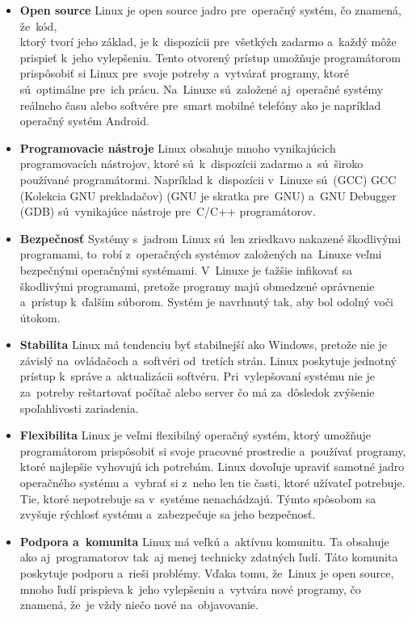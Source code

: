 \begin{itemize}
	\item \textbf{Open source} Linux je open source jadro pre~operačný systém, čo znamená, že~kód,\\
		ktorý tvorí jeho základ, je k~dispozícii pre~všetkých zadarmo a~každý môže prispieť
		k~jeho vylepšeniu. Tento otvorený prístup umožňuje programátorom prispôsobiť si Linux
		pre~svoje potreby a~vytvárať programy, ktoré sú~optimálne pre~ich prácu. Na~Linuxe
		sú~založené aj~operačné systémy reálneho času alebo softvére pre~smart mobilné telefóny
		ako je napríklad operačný systém Android.

	\item \textbf{Programovacie nástroje} Linux obsahuje mnoho vynikajúcich programovacích nástrojov, ktoré sú~k~dispozícii
		zadarmo a~sú~široko používané programátormi. Napríklad k~dispozícii v~Linuxe sú~(GCC) \acrlong{GCC} (Kolekcia GNU prekladačov)
		(GNU je skratka pre~\acrlong{GNU}) a~GNU Debugger (GDB) sú~vynikajúce nástroje pre~C/C++ programátorov.

	\item \textbf{Bezpečnosť} Systémy s~jadrom Linux sú~len zriedkavo nakazené škodlivými programami, to~robí z~operačných
		systémov založených na~Linuxe veľmi bezpečnými operačnými systémami.\cite{linuxSecurity}
		V~Linuxe je ťažšie infikovať sa škodlivými programami, pretože programy majú obmedzené
		oprávnenie a~prístup k~ďalším súborom. Systém je navrhnutý tak, aby bol odolný voči útokom.

	\item \textbf{Stabilita} Linux má tendenciu byť stabilnejší ako Windows, pretože nie je závislý na~ovládačoch a~softvéri
		od~tretích strán. Linux poskytuje jednotný prístup k~správe a~aktualizácii softvéru. Pri~vylepšovaní systému nie je
		za~potreby reštartovať počítač alebo server čo má za~dôsledok zvýšenie spoľahlivosti zariadenia.

	\item \textbf{Flexibilita} Linux je veľmi flexibilný operačný systém, ktorý umožňuje programátorom prispôsobiť si svoje pracovné
		prostredie a~používať programy, ktoré najlepšie vyhovujú ich potrebám. Linux dovoľuje upraviť samotné jadro
		operačného systému a~vybrať si z~neho len tie časti, ktoré užívateľ potrebuje. Tie, ktoré nepotrebuje sa
		v~systéme nenachádzajú. Týmto spôsobom sa zvyšuje rýchlosť systému a~zabezpečuje sa jeho bezpečnosť.

	\item \textbf{Podpora a~komunita} Linux má veľkú a~aktívnu komunitu. Ta obsahuje ako aj~programatorov tak~aj
		menej technicky zdatných ľudí. Táto komunita poskytuje podporu a~rieši problémy. Vďaka tomu, že~Linux je
		open source, mnoho ľudí prispieva k~jeho vylepšeniu a~vytvára nové programy, čo znamená, že~je vždy
		niečo nové na~objavovanie.


\end{itemize}
